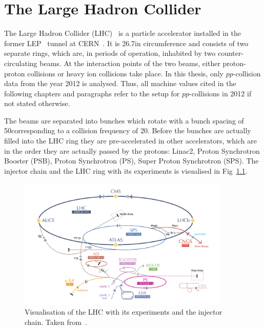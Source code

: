\chapter{The Large Hadron Collider}

The Large Hadron Collider (LHC)~\cite{bib:LHC_machine_2008,bib:LHC_2004} is a particle accelerator installed in the former LEP~\cite{bib:LEP_design_1984} tunnel at CERN~\cite{bib:CERN:web}.
It is 26.7\km in circumference and consists of two separate rings, which are, in periods of operation, inhabited by two counter-circulating beams.
At the interaction points of the two beams, either proton-proton collisions or heavy ion collisions take place.
In this thesis, only $pp$-collision data from the year 2012 is analysed.
Thus, all machine values cited in the following chapters and paragraphs refer to the setup for $pp$-collisions in 2012 if not stated otherwise.

The beams are separated into bunches which rotate with a bunch spacing of 50\ns corresponding to a collision frequency of 20\mhz.
Before the bunches are actually filled into the LHC ring they are pre-accelerated in other accelerators, which are in the order they are actually passed by the protons: Linac2, Proton  Synchrotron Booster (PSB), Proton Synchrotron (PS), Super Proton Synchrotron (SPS).
The injector chain and the LHC ring with its experiments is visualised in Fig~\ref{fig:LHC}.
\begin{figure}[!b]
  \centering
      \includegraphics[width=0.90\textwidth]{figures/experiment/LHC/LHC_small.png}
  \caption{Visualisation of the LHC with its experiments and the injector chain. Taken from~\cite{bib:CERNBrochure}.}  
  \label{fig:LHC}
\end{figure}

